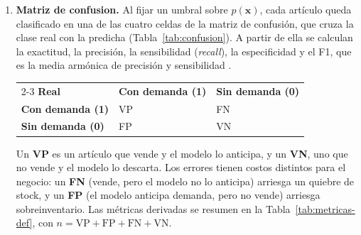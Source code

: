 \documentclass[
  journal=largetwo,
  manuscript=Laboratorio-Numero-02,
  year=2026,
  volume=1
]{cup-journal}
\begin{document}
\begin{enumerate}
  \item \textbf{Matriz de confusion.} Al fijar un umbral sobre $p(\mathbf{x})$, cada artículo queda clasificado en una de las cuatro celdas de la matriz de confusión, que cruza la clase real con la predicha (Tabla~\ref{tab:confusion}). A partir de ella se calculan la exactitud, la precisión, la sensibilidad (\textit{recall}), la especificidad y el F1, que es la media armónica de precisión y sensibilidad \autocite{james2021islr,fawcett2006roc}.
\par\medskip\noindent\begin{minipage}{\linewidth}
\label{tab:confusion}
\centering
\small
\begin{tabularx}{\linewidth}{@{}l>{\centering\arraybackslash}X>{\centering\arraybackslash}X@{}}
\toprule
 & \multicolumn{2}{c}{\textbf{Predicho}} \\
\cmidrule(l){2-3}
\textbf{Real} & \textbf{Con demanda (1)} & \textbf{Sin demanda (0)} \\
\midrule
\textbf{Con demanda (1)} & VP & FN \\
\textbf{Sin demanda (0)} & FP & VN \\
\bottomrule
\end{tabularx}
\end{minipage}\par\medskip

Un \textbf{VP} es un artículo que vende y el modelo lo anticipa, y un \textbf{VN}, uno que no vende y el modelo lo descarta. Los errores tienen costos distintos para el negocio: un \textbf{FN} (vende, pero el modelo no lo anticipa) arriesga un quiebre de stock, y un \textbf{FP} (el modelo anticipa demanda, pero no vende) arriesga sobreinventario. Las métricas derivadas se resumen en la Tabla~\ref{tab:metricas-def}, con $n=\mathrm{VP}+\mathrm{FP}+\mathrm{FN}+\mathrm{VN}$.


\end{enumerate}
\end{document}
